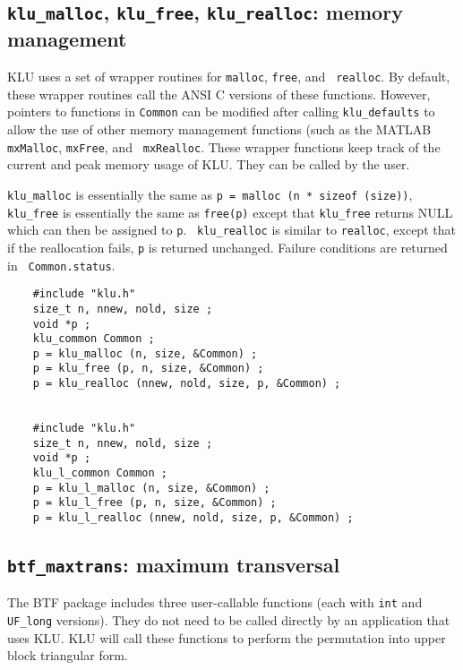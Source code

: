 \documentclass[11pt]{article}
\begin{document}
\subsection{{\tt klu\_malloc}, {\tt klu\_free}, {\tt klu\_realloc}:
memory management}

KLU uses a set of wrapper routines for {\tt malloc}, {\tt free}, and {\tt
realloc}.  By default, these wrapper routines call the ANSI C versions of these
functions.  However, pointers to functions in {\tt Common} can be modified
after calling {\tt klu\_defaults} to allow the use of other memory management
functions (such as the MATLAB {\tt mxMalloc}, {\tt mxFree}, and {\tt
mxRealloc}.  These wrapper functions keep track of the current and peak memory
usage of KLU.  They can be called by the user.

{\tt klu\_malloc} is essentially the same as {\tt p = malloc (n * sizeof
(size))}, {\tt klu\_free} is essentially the same as {\tt free(p)} except that
{\tt klu\_free} returns NULL which can then be assigned to {\tt p}.  {\tt
klu\_realloc} is similar to {\tt realloc}, except that if the reallocation
fails, {\tt p} is returned unchanged.  Failure conditions are returned in {\tt
Common.status}.

{\footnotesize
\begin{verbatim}
    #include "klu.h"
    size_t n, nnew, nold, size ;
    void *p ;
    klu_common Common ;
    p = klu_malloc (n, size, &Common) ;
    p = klu_free (p, n, size, &Common) ;
    p = klu_realloc (nnew, nold, size, p, &Common) ;


    #include "klu.h"
    size_t n, nnew, nold, size ;
    void *p ;
    klu_l_common Common ;
    p = klu_l_malloc (n, size, &Common) ;
    p = klu_l_free (p, n, size, &Common) ;
    p = klu_l_realloc (nnew, nold, size, p, &Common) ;
    \end{verbatim}
}

\subsection{{\tt btf\_maxtrans}: maximum transversal}

The BTF package includes three user-callable functions (each with {\tt int}
and {\tt UF\_long} versions).  They do not need to be called directly by an
application that uses KLU.  KLU will call these functions to perform the
permutation into upper block triangular form.
\end{document}
